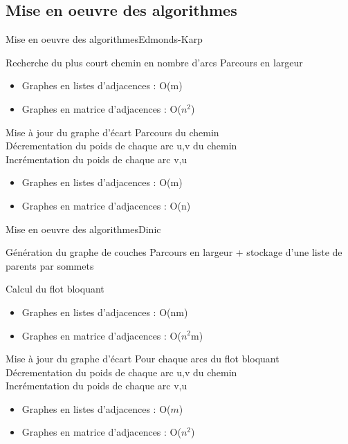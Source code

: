 \subsection{Mise en oeuvre des algorithmes}

\begin{frame}{Mise en oeuvre des algorithmes}{Edmonds-Karp}
	\begin{block}{Recherche du plus court chemin en nombre d'arcs}
  	Parcours en largeur
  	\begin{itemize}
    	\item Graphes en listes d'adjacences : O(m)
  	  \item Graphes en matrice d'adjacences : O($n^2$)
  	\end{itemize}
  \end{block}
  \begin{block}{Mise à jour du graphe d'écart}
  	Parcours du chemin \\
  	Décrementation du poids de chaque arc u,v du chemin \\
  	Incrémentation du poids de chaque arc v,u \\
  	\begin{itemize}
    	\item Graphes en listes d'adjacences : O(m)
  	  \item Graphes en matrice d'adjacences : O(n)
  	\end{itemize}
  \end{block}
\end{frame}

\begin{frame}{Mise en oeuvre des algorithmes}{Dinic}
	\begin{block}{Génération du graphe de couches}
  	Parcours en largeur + stockage d'une liste de parents par sommets
  \end{block}
  \begin{block}{Calcul du flot bloquant}
  	\begin{itemize}
    	\item Graphes en listes d'adjacences : O(nm)
  	  \item Graphes en matrice d'adjacences : O($n^2$m)
  	\end{itemize}
  \end{block}
	\begin{block}{Mise à jour du graphe d'écart}
  	Pour chaque arcs du flot bloquant \\
  	Décrementation du poids de chaque arc u,v du chemin \\
  	Incrémentation du poids de chaque arc v,u \\
  	\begin{itemize}
    	\item Graphes en listes d'adjacences : O($m$)
  	  \item Graphes en matrice d'adjacences : O($n^2$)
  	\end{itemize}
  \end{block}
\end{frame}

